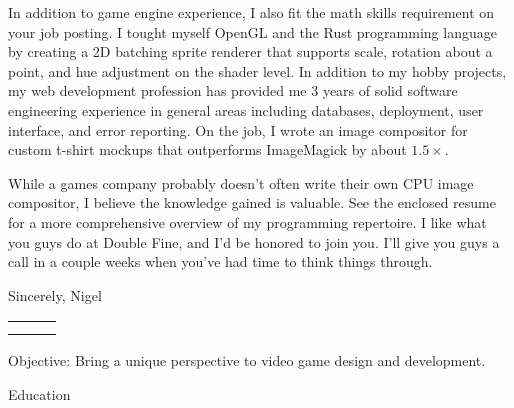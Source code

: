 \documentclass[12pt]{article}
\def \author{Nigel Baillie}
\renewcommand{\section}[1]{{\Huge{#1}}\vspace{2 mm}}
\begin{document}
In addition to game engine experience, I also fit the math skills requirement on your job posting.
I tought myself OpenGL and the Rust programming language by creating
a 2D batching sprite renderer that supports scale, rotation about a point, and
hue adjustment on the shader level. In addition to my hobby projects, my web development
profession has provided me 3 years of solid
software engineering experience in general areas including databases, deployment, user
interface, and error reporting. On the job, I wrote an image compositor for custom t-shirt
mockups that outperforms ImageMagick by about $1.5\times$.
\newline

While a games company probably doesn't often write their own CPU image compositor,
I believe the knowledge gained is valuable. See the enclosed resume for a more
comprehensive overview of my programming repertoire. I like what you guys do at
Double Fine, and I'd be honored to join you. I'll give you guys
a call in a couple weeks when you've had time to think things through.
\newline

Sincerely,
\newline
Nigel


\pagebreak


\begin{tabular} {
  p{}
  p{}
  p{}
}
  \begin{flushleft}
  \end{flushleft}
  &
  \begin{center}
    {\Huge{\author}}\\
  \end{center}
  &
  \begin{flushright}
  \end{flushright}
\end{tabular}

\section{Objective:} Bring a unique perspective to video game design and development.
\newline

\section{Education}
\hline
\end{document}
